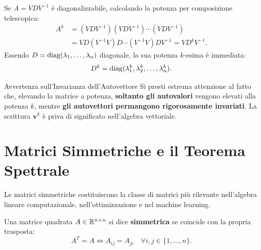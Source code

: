\begin{corollary}
Se $A = V D V^{-1}$ \`e diagonalizzabile, calcolando la potenza per composizione telescopica:
\begin{align}
    A^k &= (V D V^{-1})(V D V^{-1}) \cdots (V D V^{-1}) \nonumber \\
    &= V D (V^{-1}V) D \cdots (V^{-1}V) D V^{-1} = V D^k V^{-1}.
\end{align}
Essendo $D = \operatorname{diag}(\lambda_1, \dots, \lambda_n)$ diagonale, la sua potenza $k$-esima \`e immediata:
\begin{equation}
    D^k = \operatorname{diag}(\lambda_1^k, \lambda_2^k, \dots, \lambda_n^k).
\end{equation}
\end{corollary}

\begin{alertblock}{Avvertenza sull'Invarianza dell'Autovettore}
Si presti estrema attenzione al fatto che, elevando la matrice a potenza, \textbf{soltanto gli autovalori} vengono elevati alla potenza $k$, mentre \textbf{gli autovettori permangono rigorosamente invariati}. La scrittura $\mathbf{v}^k$ \`e priva di significato nell'algebra vettoriale.
\end{alertblock}

\FloatBarrier
\section{Matrici Simmetriche e il Teorema Spettrale}

Le matrici simmetriche costituiscono la classe di matrici pi\`u rilevante nell'algebra lineare computazionale, nell'ottimizzazione e nel machine learning.

\begin{definition}
Una matrice quadrata $A \in \mathbb{R}^{n \times n}$ si dice \textbf{simmetrica} se coincide con la propria trasposta:
\begin{equation}
    A^T = A \iff A_{ij} = A_{ji} \quad \forall i, j \in \{1, \dots, n\}.
\end{equation}
\end{definition}


